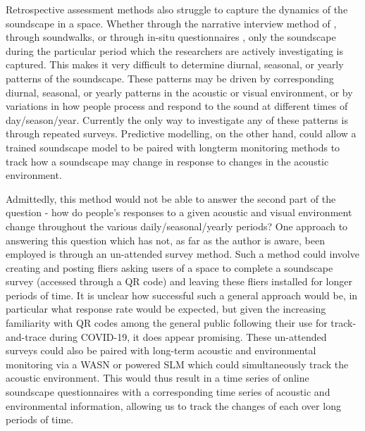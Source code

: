 Retrospective assessment methods also struggle to capture the dynamics of the soundscape in a space. Whether through the narrative interview method of , through soundwalks, or through in-situ questionnaires \citep{Mitchell2020Soundscape}, only the soundscape during the particular period which the researchers are actively investigating is captured. This makes it very difficult to determine diurnal, seasonal, or yearly patterns of the soundscape. These patterns may be driven by corresponding diurnal, seasonal, or yearly patterns in the acoustic or visual environment, or by variations in how people process and respond to the sound at different times of day/season/year. Currently the only way to investigate any of these patterns is through repeated surveys. Predictive modelling, on the other hand, could allow a trained soundscape model to be paired with longterm monitoring methods to track how a soundscape may change in response to changes in the acoustic environment. 

Admittedly, this method would not be able to answer the second part of the question - how do people's responses to a given acoustic and visual environment change throughout the various daily/seasonal/yearly periods? One approach to answering this question which has not, as far as the author is aware, been employed is through an un-attended survey method. Such a method could involve creating and posting fliers asking users of a space to complete a soundscape survey (accessed through a QR code) and leaving these fliers installed for longer periods of time. It is unclear how successful such a general approach would be, in particular what response rate would be expected, but given the increasing familiarity with QR codes among the general public following their use for track-and-trace during COVID-19, it does appear promising. These un-attended surveys could also be paired with long-term acoustic and environmental monitoring via a WASN or powered SLM which could simultaneously track the acoustic environment. This would thus result in a time series of online soundscape questionnaires with a corresponding time series of acoustic and environmental information, allowing us to track the changes of each over long periods of time.

